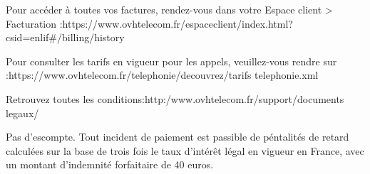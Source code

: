 \documentclass[12pt]{article}
\begin{document}
\par Pour accéder à toutes vos factures, rendez-vous dans votre Espace client > Facturation :https://www.ovhtelecom.fr/espaceclient/index.html?csid=enlif\#/billing/history


\par Pour consulter les tarifs en vigueur pour les appels, veuillez-vous rendre sur :https://www.ovhtelecom.fr/telephonie/decouvrez/tarifs telephonie.xml


\par Retrouvez toutes les conditions:http:/www.ovhtelecom.fr/support/documents legaux/

\par Pas d'escompte. Tout incident de paiement est passible de péntalités de retard calculées sur la base de trois fois le taux d'intérêt légal en vigueur en France, avec un montant d'indemnité
forfaitaire de 40 euros.



\clearpage
\end{document}
